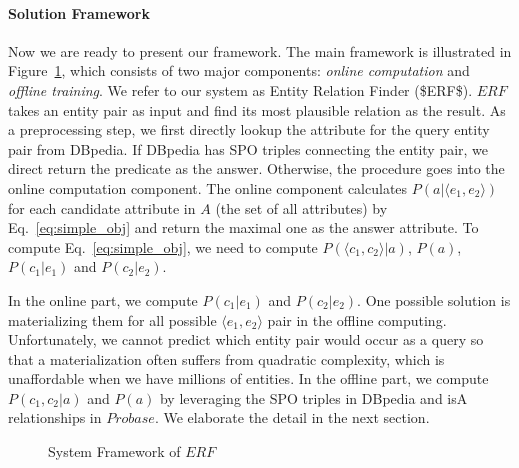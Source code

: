 \paragraph{Solution Framework}
Now we are ready to present our framework. The main framework is illustrated in Figure~\ref{fig:framework}, which consists of two major components: {\it online computation} and {\it offline training}. 
We refer to our system as \ac{Entity Relation Finder ($ERF$)}.
$ERF$ takes an entity pair as input and find its most plausible relation as the result.
As a preprocessing step, we first directly lookup the attribute for the query entity pair from DBpedia.
If DBpedia has SPO triples connecting the entity pair, we direct return the predicate as the answer.
Otherwise, the procedure goes into the online computation component.
The online component calculates $ P(a|  \langle e_1,e_2 \rangle  )$ for each candidate attribute in $A$ (the set of all attributes) by Eq.~\ref{eq:simple_obj} and return the maximal one as the answer attribute. To compute Eq.~\ref{eq:simple_obj}, we need to compute $P(\langle c_1,c_2 \rangle |a)$, $P(a)$, $P(c_1|e_1)$ and $P(c_2|e_2)$. 

In the online part, we compute $P(c_1|e_1)$ and $P(c_2|e_2)$.
One possible solution is materializing them for all possible $\langle e_1,e_2 \rangle$ pair in the offline computing.
Unfortunately, we cannot predict which entity pair would occur as a query so that a materialization often suffers from quadratic complexity, which is unaffordable when we have millions of entities. 
In the offline part, we compute $P(c_1,c_2|a)$ and $P(a)$ by leveraging the SPO triples in DBpedia and isA relationships in $Probase$. 
We elaborate the detail in the next section.

\begin{figure}[!t]
\vspace{-4mm}
\centering
{}
\vspace{-4mm}
\caption{System Framework of $ERF$}
\label{fig:framework}
\vspace{-6mm}
\end{figure}


